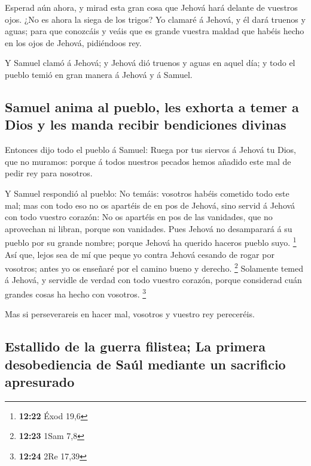  Esperad aún ahora, y mirad esta gran cosa que Jehová hará
delante de vuestros ojos.  ¿No es ahora la siega de los
trigos? Yo clamaré á Jehová, y él dará truenos y aguas; para que
conozcáis y veáis que es grande vuestra maldad que habéis hecho en los
ojos de Jehová, pidiéndoos rey.

 Y Samuel clamó á Jehová; y Jehová dió truenos y aguas en
aquel día; y todo el pueblo temió en gran manera á Jehová y á Samuel.

\hypertarget{samuel-anima-al-pueblo-les-exhorta-a-temer-a-dios-y-les-manda-recibir-bendiciones-divinas}{%
\subsection{Samuel anima al pueblo, les exhorta a temer a Dios y les
manda recibir bendiciones
divinas}\label{samuel-anima-al-pueblo-les-exhorta-a-temer-a-dios-y-les-manda-recibir-bendiciones-divinas}}

 Entonces dijo todo el pueblo á Samuel: Ruega por tus
siervos á Jehová tu Dios, que no muramos: porque á todos nuestros
pecados hemos añadido este mal de pedir rey para nosotros.

 Y Samuel respondió al pueblo: No temáis: vosotros habéis
cometido todo este mal; mas con todo eso no os apartéis de en pos de
Jehová, sino servid á Jehová con todo vuestro corazón:  No
os apartéis en pos de las vanidades, que no aprovechan ni libran, porque
son vanidades.  Pues Jehová no desamparará á su pueblo por
su grande nombre; porque Jehová ha querido haceros pueblo suyo.
\footnote{\textbf{12:22} Éxod 19,6}  Así que, lejos sea de
mí que peque yo contra Jehová cesando de rogar por vosotros; antes yo os
enseñaré por el camino bueno y derecho. \footnote{\textbf{12:23} 1Sam
  7,8}  Solamente temed á Jehová, y servidle de verdad con
todo vuestro corazón, porque considerad cuán grandes cosas ha hecho con
vosotros. \footnote{\textbf{12:24} 2Re 17,39}

 Mas si perseverareis en hacer mal, vosotros y vuestro rey
pereceréis.

\hypertarget{estallido-de-la-guerra-filistea-la-primera-desobediencia-de-sauxfal-mediante-un-sacrificio-apresurado}{%
\subsection{Estallido de la guerra filistea; La primera desobediencia de
Saúl mediante un sacrificio
apresurado}\label{estallido-de-la-guerra-filistea-la-primera-desobediencia-de-sauxfal-mediante-un-sacrificio-apresurado}}

